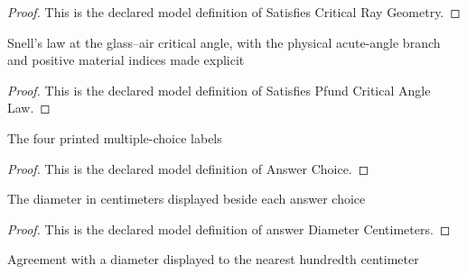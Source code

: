 \begin{proof}
  This is the declared model definition of Satisfies Critical Ray Geometry.
\end{proof}
\begin{definition}
  \label{def:physics:phyx-mini-0022:phyxminiproblems-problemphyxmini0022-satisfiespfundcriticalanglelaw}
  Snell's law at the glass--air critical angle, with the physical acute-angle branch and positive material indices made explicit
\end{definition}
\begin{proof}
  This is the declared model definition of Satisfies Pfund Critical Angle Law.
\end{proof}
\begin{definition}
  \label{def:physics:phyx-mini-0022:phyxminiproblems-problemphyxmini0022-answerchoice}
  The four printed multiple-choice labels
\end{definition}
\begin{proof}
  This is the declared model definition of Answer Choice.
\end{proof}
\begin{definition}
  \label{def:physics:phyx-mini-0022:phyxminiproblems-problemphyxmini0022-answerdiametercentimeters}
  The diameter in centimeters displayed beside each answer choice
\end{definition}
\begin{proof}
  This is the declared model definition of answer Diameter Centimeters.
\end{proof}
\begin{definition}
  \label{def:physics:phyx-mini-0022:phyxminiproblems-problemphyxmini0022-matchesanswertonearesthundredth}
  Agreement with a diameter displayed to the nearest hundredth centimeter
\end{definition}
